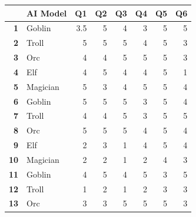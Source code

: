 \begin{table}[hbtp]
  \centering
  \begin{tabular}{|rlrrr|rrr|}
    \toprule
    \rowcolor[rgb]{ 0,  0,  0} \multicolumn{1}{|l}{\textcolor[rgb]{ 1,  1,  1}{\textbf{Test \#}}} & \textcolor[rgb]{ 1,  1,  1}{\textbf{AI Model}} & \multicolumn{1}{l}{\textcolor[rgb]{ 1,  1,  1}{\textbf{Q1}}} & \multicolumn{1}{l}{\textcolor[rgb]{ 1,  1,  1}{\textbf{Q2}}} & \multicolumn{1}{l}{\textcolor[rgb]{ 1,  1,  1}{\textbf{Q3}}} & \multicolumn{1}{l}{\textcolor[rgb]{ 1,  1,  1}{\textbf{Q4}}} & \multicolumn{1}{l}{\textcolor[rgb]{ 1,  1,  1}{\textbf{Q5}}} & \multicolumn{1}{l|}{\textcolor[rgb]{ 1,  1,  1}{\textbf{Q6}}} \\
    \midrule
    \rowcolor[rgb]{ .851,  .851,  .851} \textbf{1} & Goblin & 3.5   & 5    & 4     & 3     & 5     & 5 \\
    \midrule
    \textbf{2} & Troll & 5     & 5     & 5       & 4     & 5     & 3 \\
    \midrule
    \rowcolor[rgb]{ .851,  .851,  .851} \textbf{3} & Orc   & 4     & 4     & 5       & 5     & 5     & 3 \\
    \midrule
    \textbf{4} & Elf   & 4     & 5     & 4      & 4     & 5     & 1 \\
    \midrule
    \rowcolor[rgb]{ .851,  .851,  .851} \textbf{5} & Magician  & 5     & 3     & 4     & 5     & 5     & 4 \\
    \midrule
    \textbf{6} & Goblin & 5     & 5     & 5   & 3     & 5     & 4 \\
    \midrule
    \rowcolor[rgb]{ .851,  .851,  .851} \textbf{7} & Troll & 4     & 4     & 5     &   3     & 5     & 5 \\
    \midrule
    \textbf{8} & Orc   & 5     & 5     & 5    & 4     & 5     & 4 \\
    \midrule
    \rowcolor[rgb]{ .851,  .851,  .851} \textbf{9} & Elf   & 2     & 3     & 1      & 4     & 5     & 4 \\
    \midrule
    \textbf{10} & Magician & 2     & 2     & 1     & 2     & 4     & 3 \\
    \midrule
    \rowcolor[rgb]{ .851,  .851,  .851} \textbf{11} & Goblin & 4     & 5     & 4     & 5     & 3     & 5 \\
    \midrule
    \textbf{12} & Troll & 1     & 2     & 1     & 2     & 3     & 3 \\
    \midrule
    \rowcolor[rgb]{ .851,  .851,  .851} \textbf{13} & Orc   & 3     & 3     & 5    & 5     & 5     & 3 \\

\end{tabular}
\end{table}
